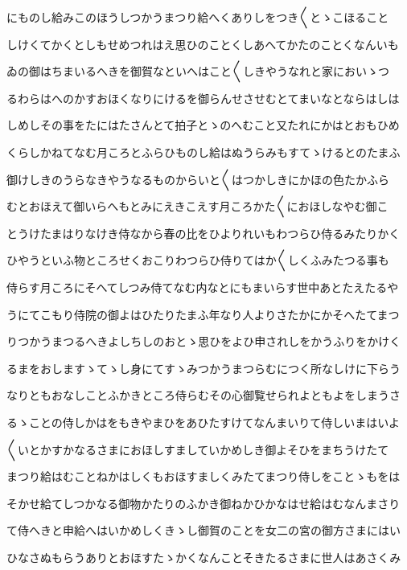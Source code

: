 \documentclass[a4paper,11pt,landscape]{ltjtarticle}
\begin{document}
\par\medskip
にものし給みこのほうしつかうまつり給へくありしをつき〱とゝこほること
\par\medskip
しけくてかくとしもせめつれはえ思ひのことくしあへてかたのことくなんいも
\par\medskip
ゐの御はちまいるへきを御賀なといへはこと〱しきやうなれと家においゝつ
\par\medskip
るわらはへのかすおほくなりにけるを御らんせさせむとてまいなとならはしは
\par\medskip
しめしその事をたにはたさんとて拍子とゝのへむこと又たれにかはとおもひめ
\par\medskip
くらしかねてなむ月ころとふらひものし給はぬうらみもすてゝけるとのたまふ
\par\medskip
御けしきのうらなきやうなるものからいと〱はつかしきにかほの色たかふら
\par\medskip
むとおほえて御いらへもとみにえきこえす月ころかた〱におほしなやむ御こ
\par\medskip
とうけたまはりなけき侍なから春の比をひよりれいもわつらひ侍るみたりかく
\par\medskip
ひやうといふ物ところせくおこりわつらひ侍りてはか〱しくふみたつる事も
\par\medskip
侍らす月ころにそへてしつみ侍てなむ内なとにもまいらす世中あとたえたるや
\par\medskip
うにてこもり侍院の御よはひたりたまふ年なり人よりさたかにかそへたてまつ
\par\medskip
りつかうまつるへきよしちしのおとゝ思ひをよひ申されしをかうふりをかけく
\par\medskip
るまをおしますゝてゝし身にてすゝみつかうまつらむにつく所なしけに下らう
\par\medskip
なりともおなしことふかきところ侍らむその心御覧せられよともよをしまうさ
\par\medskip
るゝことの侍しかはをもきやまひをあひたすけてなんまいりて侍しいまはいよ
\par\medskip
〱いとかすかなるさまにおほしすましていかめしき御よそひをまちうけたて
\par\medskip
まつり給はむことねかはしくもおほすましくみたてまつり侍しをことゝもをは
\par\medskip
そかせ給てしつかなる御物かたりのふかき御ねかひかなはせ給はむなんまさり
\par\medskip
て侍へきと申給へはいかめしくきゝし御賀のことを女二の宮の御方さまにはい
\par\medskip
ひなさぬもらうありとおほすたゝかくなんことそきたるさまに世人はあさくみ
\par\medskip
\end{document}
